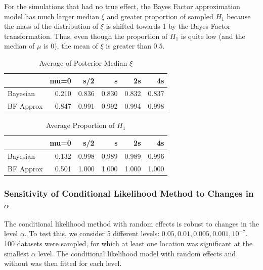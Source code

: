 \documentclass[AMA,STIX1COL]{WileyNJD-v2}\usepackage[]{graphicx}\usepackage[]{color}
\newenvironment{knitrout}{}{} %
\begin{document}
For the simulations that had no true effect, the Bayes Factor approximation model has much larger median $\xi$ and greater proportion of sampled $H_1$ because the mass of the distribution of $\xi$ is shifted towards 1 by the Bayes Factor transformation. Thus, even though the proportion of $H_1$ is quite low (and the median of $\mu$ is 0), the mean of $\xi$ is greater than $0.5$.


\begin{knitrout}
\color{fgcolor}\begin{table}

\caption{\label{tab:unnamed-chunk-25}Average of Posterior Median $\xi$}
\centering
\begin{tabular}[t]{l|r|r|r|r|r}
\hline
  & mu=0 & s/2 & s & 2s & 4s\\
\hline
Bayesian & 0.210 & 0.836 & 0.830 & 0.832 & 0.837\\
\hline
BF Approx & 0.847 & 0.991 & 0.992 & 0.994 & 0.998\\
\hline
\end{tabular}
\end{table}


\end{knitrout}

\begin{knitrout}
\color{fgcolor}\begin{table}

\caption{\label{tab:unnamed-chunk-26}Average Proportion of $H_1$}
\centering
\begin{tabular}[t]{l|r|r|r|r|r}
\hline
  & mu=0 & s/2 & s & 2s & 4s\\
\hline
Bayesian & 0.132 & 0.998 & 0.989 & 0.989 & 0.996\\
\hline
BF Approx & 0.501 & 1.000 & 1.000 & 1.000 & 1.000\\
\hline
\end{tabular}
\end{table}


\end{knitrout}


\subsubsection{Sensitivity of Conditional Likelihood Method to Changes in $\alpha$}

The conditional likelihood method with random effects is robust to changes in the level $\alpha$. To test this, we consider 5 different levels: $0.05, 0.01, 0.005, 0.001, 10^{-7}$. 100 datasets were sampled, for which at least one location was significant at the smallest $\alpha$ level. The conditional likelihood model with random effects and without was then fitted for each level. 
\end{document}

